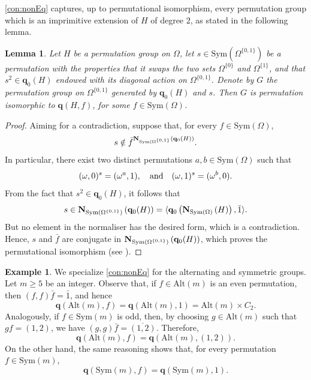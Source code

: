 \documentclass[a4paper]{amsart}
\newcommand{\Sym}{\mathrm{Sym}}
\newcommand{\Alt}{\mathrm{Alt}}
\newcommand{\qrk}{\mathbf{q}}
\newtheorem{lemma}[theorem]{Lemma}
\theoremstyle{definition}
\newtheorem{example}[theorem]{Example}
\begin{document}
\cref{con:nonEq} captures, up to permutational isomorphism, every permutation group which is an imprimitive extension of $H$ of degree $2$, as stated in the following lemma.
\begin{lemma}\label{lemma:GodWhy}
    Let $H$ be a permutation group on $\Omega$, let $s\in \Sym(\Omega^{\{0,1\}})$ be a permutation with the properties that it swaps the two sets $\Omega^{\{0\}}$ and $\Omega^{\{1\}}$, and that $s^2 \in \qrk_0(H)$ endowed with its diagonal action on $\Omega^{\{0,1\}}$. Denote by $G$ the permutation group on $\Omega^{\{0,1\}}$ generated by $\qrk_0(H)$ and $s$. Then $G$ is permutation isomorphic to $\qrk(H,f)$, for some $f \in \Sym(\Omega)$.
\end{lemma}
\begin{proof}
    Aiming for a contradiction, suppose that, for every $f \in \Sym(\Omega)$,
    \[ s \notin {\bar f}^ { {\bf N}_{\Sym(\Omega^{\{0,1\}}} \left( \qrk_0(H) \right) }.\]
    In particular, there exist two distinct permutations $a,b \in \Sym(\Omega)$ such that
    \[ (\omega,0)^s = (\omega^a,1), \quad \hbox{and} \quad (\omega,1)^s = (\omega^b,0) .\]
    From the fact that $s^2 \in \qrk_0(H)$, it follows that
    \[ s \in {\bf N}_{\Sym(\Omega^{\{0,1\}})} \left( \qrk_0(H) \right) = \langle \qrk_0\left( {\bf N}_{\Sym(\Omega)} \left( H \right) \right), \bar 1 \rangle .\]
    But no element in the normaliser has the desired form, which is a contradiction. Hence, $s$ and $\bar f$ are conjugate in ${\bf N}_{\Sym(\Omega^{\{0,1\}})} \left( \qrk_0(H) \right)$, which proves the permutational isomorphism (see \cite[Exercise 1.6.1]{DixonMortimer}).
\end{proof}

\begin{example}\label{ex:cringe}
    We specialize \cref{con:nonEq} for the alternating and symmetric groups.
    Let $m\ge 5$ be an integer. Observe that, if $f \in \Alt(m)$ is an even permutation, then $(f,f)\bar f = \bar 1$, and hence
    \[ \qrk(\Alt(m),f) = 
    \qrk(\Alt(m),1) = \Alt(m) \times C_2 .\]
    Analogously, if $f\in \Sym(m)$ is odd, then, by choosing $g\in \Alt(m)$ such that $gf = (1,2)$, we have $(g,g) \bar f = {\overline{(1,2)}}$. Therefore,
    \[ \qrk(\Alt(m),f) = 
    \qrk(\Alt(m), (1,2)) .\]
    On the other hand, the same reasoning shows that, for every permutation  $f \in \Sym(m)$,
    \[ \qrk(\Sym(m),f) = 
    \qrk(\Sym(m), 1) .\]
\end{example}
\end{document}
